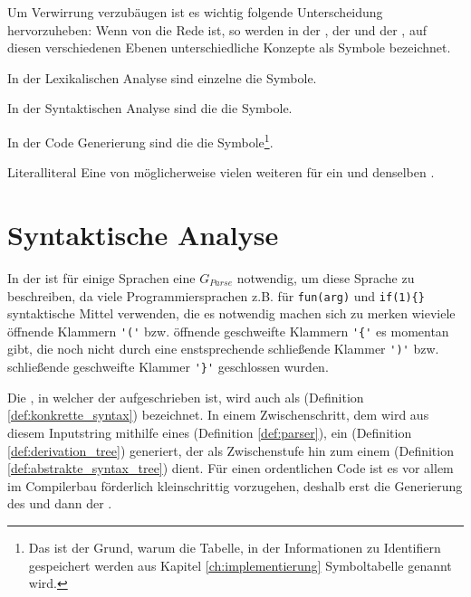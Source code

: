 
\begin{Special_Paragraph}
  Um Verwirrung verzubäugen ist es wichtig folgende Unterscheidung hervorzuheben: Wenn von  die Rede ist, so werden in der , der  und der , auf diesen verschiedenen Ebenen unterschiedliche Konzepte als Symbole bezeichnet.

  In der Lexikalischen Analyse sind einzelne  die Symbole.

  In der Syntaktischen Analyse sind die  die Symbole.

  In der Code Generierung sind die  die Symbole\footnote{Das ist der Grund, warum die Tabelle, in der Informationen zu Identifiern gespeichert werden aus Kapitel \ref{ch:implementierung} Symboltabelle genannt wird.}.
\end{Special_Paragraph}

\begin{Definition}{Literal}{literal}
  Eine von möglicherweise vielen weiteren  für ein und denselben .
\end{Definition}


\section{Syntaktische Analyse}
In der  ist für einige Sprachen eine  $G_{Parse}$ notwendig, um diese Sprache zu beschreiben, da viele Programmiersprachen z.B. für  \verb|fun(arg)| und  \verb|if(1){}| syntaktische Mittel verwenden, die es notwendig machen sich zu merken wieviele öffnende Klammern \verb|'('| bzw. öffnende geschweifte Klammern \verb|'{'| es momentan gibt, die noch nicht durch eine enstsprechende schließende Klammer \verb|')'| bzw. schließende geschweifte Klammer \verb|'}'| geschlossen wurden.


Die , in welcher der  aufgeschrieben ist, wird auch als  (Definition \ref{def:konkrette_syntax}) bezeichnet. In einem Zwischenschritt, dem  wird aus diesem Inputstring mithilfe eines  (Definition \ref{def:parser}), ein  (Definition \ref{def:derivation_tree}) generiert, der als Zwischenstufe hin zum einem  (Definition \ref{def:abstrakte_syntax_tree}) dient. Für einen ordentlichen Code ist es vor allem im Compilerbau förderlich kleinschrittig vorzugehen, deshalb erst die Generierung des  und dann der .

